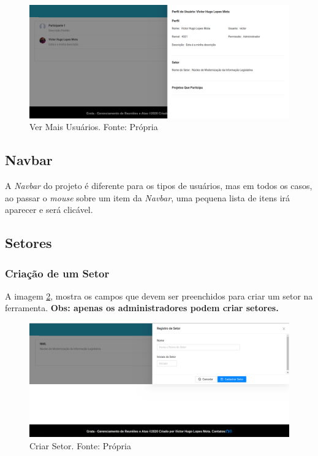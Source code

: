 \begin{figure}[H]
    \centering
    \includegraphics[width=1.0\textwidth]{figuras/ver_mais_usuarios.png}
    \caption{Ver Mais Usuários. Fonte: Própria}
    \label{img:ver_mais}
\end{figure}

\subsection{Navbar}

A \textit{Navbar} do projeto é diferente para os tipos de usuários, mas em todos os casos, ao passar o \textit{mouse} sobre um item da \textit{Navbar}, uma pequena lista de itens irá aparecer e será clicável.

\subsection{Setores}

\subsubsection{Criação de um Setor}

A imagem \ref{img:criacao_de_setor}, mostra os campos que devem ser preenchidos para criar um setor na ferramenta. \textbf{Obs: apenas os administradores podem criar setores.}

\begin{figure}[H]
    \centering
    \includegraphics[width=1.0\textwidth]{figuras/criar_setor.png}
    \caption{Criar Setor. Fonte: Própria}
    \label{img:criacao_de_setor}
\end{figure}

